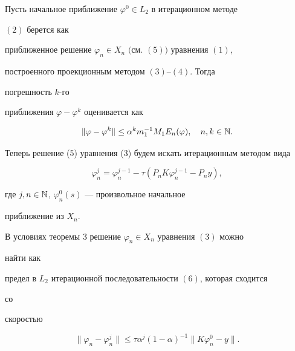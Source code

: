 \begin{thm}


Пусть начальное приближение $\varphi^0\in L_2$ в итерационном методе 


$(2)$ берется как 


приближенное решение $\varphi_n\in X_n$ $($см. $(5))$ уравнения $(1)$,


построенного проекционным методом $(3)$--$(4)$. Тогда 


погрешность $k$-го 


приближения $\varphi-\varphi^k$ оценивается как


$$


\|\varphi-\varphi^k\|\le \alpha^k m^{-1}_1 M_1E_n(\varphi),\quad


n,k\in\Bbb N.


$$


\end{thm}





Теперь решение (5) уравнения (3) будем искать итерационным методом вида


\begin{equation}


\varphi^j_n=\varphi^{j-1}_n-\tau(P_n K\varphi^{j-1}_n-P_n y),


\end{equation}


где $j,n\in\Bbb N$, $\varphi^0_n(s)$ --- произвольное начальное 


приближение из $X_n$.





\begin{thm}


В условиях теоремы $3$ решение $\varphi_n\in X_n$ уравнения $(3)$ можно 


найти как 


предел в $L_2$ итерационной последовательности $(6)$, которая сходится 


со 


скоростью


$$


\|\varphi_n-\varphi^j_n\|\le\tau\alpha^j(1-\alpha)^{-1}


\|K\varphi^0_n-y\|.


$$


\end{thm}





